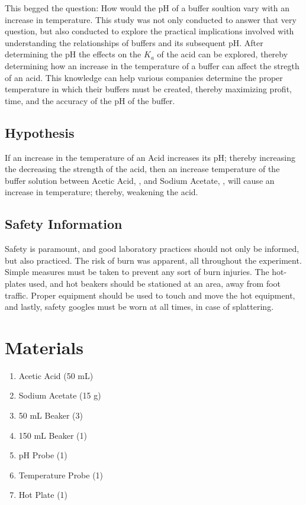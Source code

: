 \documentclass{article}
\begin{document}
\noindent
This begged the question: How would the pH of a buffer soultion vary with an increase in temperature. This study was not only conducted to answer that very question, but also conducted to explore the practical implications involved with understanding the relationships of buffers and its subsequent pH. After determining the pH the effects on the $K_a$ of the acid can be explored, thereby determining how an increase in the temperature of a buffer can affect the stregth of an acid. This knowledge can help various companies determine the proper temperature in which their buffers must be created, thereby maximizing profit, time, and the accuracy of the pH of the buffer.  
\subsection*{Hypothesis}%
If an increase in the temperature of an Acid increases its pH; thereby increasing the decreasing the strength of the acid, then an increase temperature of the buffer solution between Acetic Acid, , and Sodium Acetate, , will cause an increase in temperature; thereby, weakening the acid. 	
\subsection*{Safety Information}%
Safety is paramount, and good laboratory practices should not only be informed, but also practiced. The risk of burn was apparent, all throughout the experiment. Simple measures must be taken to prevent any sort of burn injuries. The hot-plates used, and hot beakers should be stationed at an area, away from foot traffic. Proper equipment should be used to touch and move the hot equipment, and lastly, safety googles must be worn at all times, in case of splattering.
\section*{Materials} %
\begin{enumerate}
\item Acetic Acid (50 mL)
\item Sodium Acetate (15 g)
\item 50 mL Beaker (3)
\item 150 mL Beaker (1)
\item pH Probe (1)
\item Temperature Probe (1)
\item Hot Plate (1)
\end{enumerate}
\end{document}
